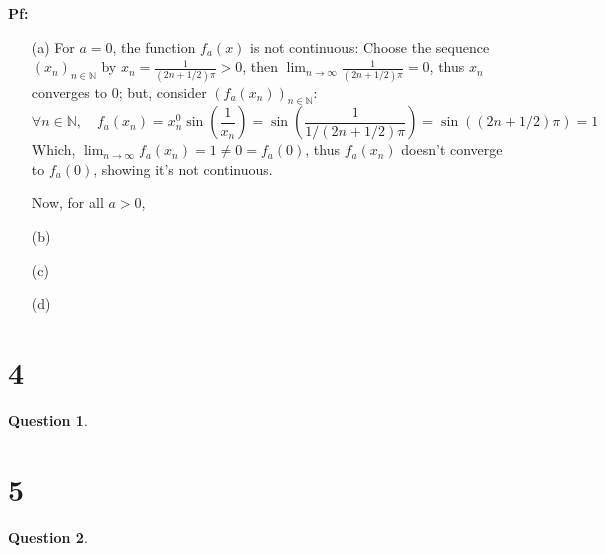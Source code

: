 \documentclass{article}
\newtheorem{question}{Question}
\begin{document}
\textbf{Pf:}

\begin{itemize}
    \item[(a)] For $a=0$, the function $f_a(x)$ is not continuous: Choose the sequence $(x_n)_{n\in\mathbb{N}}$ by $x_n=\frac{1}{(2n+1/2)\pi} >0$, 
    then $\lim_{n\rightarrow\infty}\frac{1}{(2n+1/2)\pi}=0$, thus $x_n$ converges to $0$; but, consider $(f_a(x_n))_{n\in\mathbb{N}}$:
    $$\forall n\in\mathbb{N},\quad f_a(x_n) = x_n^0\sin\left(\frac{1}{x_n}\right) = \sin\left(\frac{1}{1/(2n+1/2)\pi}\right) = \sin((2n+1/2)\pi) = 1$$
    Which, $\lim_{n\rightarrow\infty}f_a(x_n) = 1\neq 0 = f_a(0)$, thus $f_a(x_n)$ doesn't converge to $f_a(0)$, showing it's not continuous.
    
    \hfill

    Now, for all $a>0$,
    \item[(b)]
    \item[(c)]
    \item[(d)]   
\end{itemize}

\break

\section*{4}
\begin{question}
    
\end{question}

\break

\section*{5}
\begin{question}
    
\end{question}
\end{document}
